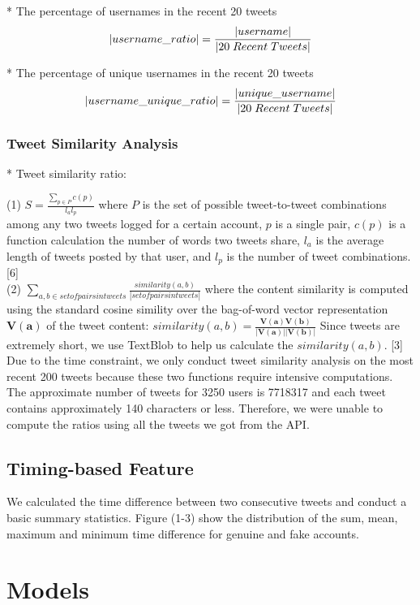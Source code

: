 \documentclass[a4paper, twoside, 12pt]{report}
\DeclarePairedDelimiter\abs{\lvert}{\rvert}%
\begin{document}
* The percentage of usernames in the recent 20 tweets
\[\abs{username\_ratio} = \dfrac{\abs{username}}{\abs{20 \; Recent \;Tweets}}\]


* The percentage of unique usernames in the recent 20 tweets
\[\abs{username\_unique\_ratio} = \dfrac{\abs{unique\_username}}{\abs{20 \; Recent \;Tweets}}\]


\subsubsection{Tweet Similarity Analysis}

* Tweet similarity ratio: 

(1) $S=\frac{\sum_{p\in P}c(p)}{l_al_p}$ where $P$ is the set of possible tweet-to-tweet combinations among any two tweets logged for a certain account, $p$ is a single pair, $c(p)$ is a function calculation the number of words two tweets share, $l_a$ is the average length of tweets posted by that user, and $l_p$ is the number of tweet combinations. [6]\\

(2) $\sum_{a,b \in set of pairs in tweets}\frac{similarity(a,b)}{|set of pairs in tweets|}$ where the content similarity is computed using the standard cosine simility over the bag-of-word vector representation $\mathbf{V(a)}$ of the tweet content: $similarity(a,b)=\frac{\mathbf{V(a)}\mathbf{V(b)}}{|\mathbf{V(a)}||\mathbf{V(b)}|}$ Since tweets are extremely short, we use TextBlob to help us calculate the $similarity(a,b)$. [3]\\

\noindent Due to the time constraint, we only conduct tweet similarity analysis on the most recent 200 tweets because these two functions require intensive computations. The approximate number of tweets for 3250 users is 7718317 and each tweet contains approximately 140 characters or less. Therefore, we were unable to compute the ratios using all the tweets we got from the API. 


\subsection{Timing-based Feature}
We calculated the time difference between two consecutive tweets and conduct a basic summary statistics. Figure (1-3) show the distribution of the sum, mean, maximum and minimum time difference for genuine and fake accounts. 

\section{Models}
\end{document}
